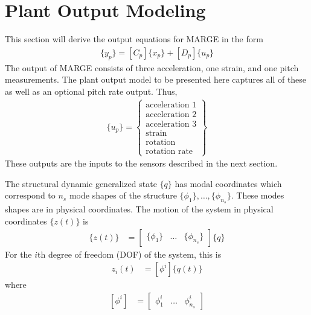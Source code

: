 \section{Plant Output Modeling}

This section will derive the output equations for MARGE in the form
\begin{align}
	\{y_p\} = [C_p]\{x_p\}+[D_p]\{u_p\}
\end{align}
The output of MARGE consists of three acceleration, one strain, and one pitch measurements. The plant output model to be presented here captures all of these as well as an optional pitch rate output. Thus,
\begin{align}
	\{u_p\} = \begin{Bmatrix}
		\text{acceleration 1} \\
		\text{acceleration 2} \\
		\text{acceleration 3} \\
		\text{strain} \\
		\text{rotation} \\
		\text{rotation rate}
	\end{Bmatrix}
\end{align}
These outputs are the inputs to the sensors described in the next section.

The structural dynamic generalized state $\{q\}$ has modal coordinates which correspond to $n_s$ mode shapes of the structure $\{\phi_1\}, \dots, \{\phi_{n_s}\}$. These modes shapes are in physical coordinates. The motion of the system in physical coordinates $\{z(t)\}$ is
\begin{align}
	\{z(t)\} &= \begin{bmatrix} \{\phi_1\} & \dots & \{\phi_{n_s}\} \end{bmatrix} \{q\}
\end{align}
For the $i$th degree of freedom (DOF) of the system, this is
\begin{align}
	z_i(t) &= \left[ \phi^i \right] \{q(t)\}
\end{align}
where
\begin{align}
	\left[ \phi^i \right] &= \begin{bmatrix} \phi_1^i & \dots & \phi_{n_s}^i \end{bmatrix}
\end{align}

